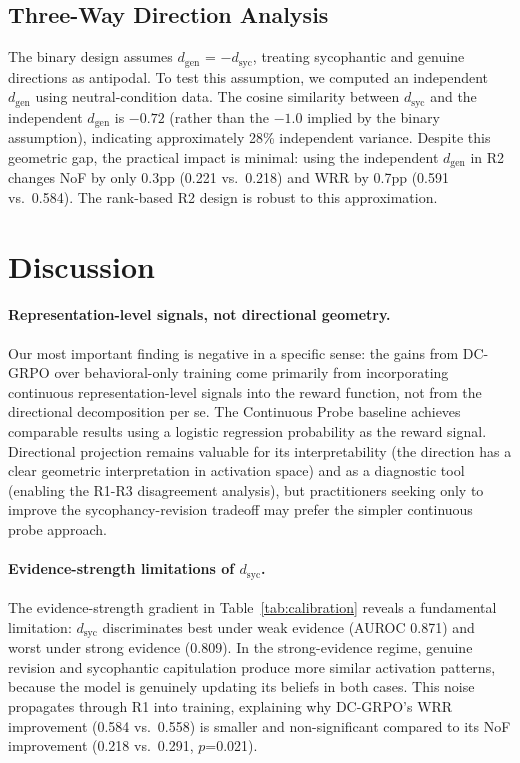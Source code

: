 \documentclass[11pt,a4paper]{article}
\newcommand{\dsyc}{$d_{\text{syc}}$}
\newcommand{\dgen}{$d_{\text{gen}}$}
\begin{document}
\subsection{Three-Way Direction Analysis}

The binary design assumes \dgen{} = $-$\dsyc{}, treating sycophantic and genuine directions as antipodal. To test this assumption, we computed an independent \dgen{} using neutral-condition data. The cosine similarity between \dsyc{} and the independent \dgen{} is $-0.72$ (rather than the $-1.0$ implied by the binary assumption), indicating approximately 28\% independent variance. Despite this geometric gap, the practical impact is minimal: using the independent \dgen{} in R2 changes NoF by only 0.3pp (0.221 vs.\ 0.218) and WRR by 0.7pp (0.591 vs.\ 0.584). The rank-based R2 design is robust to this approximation.

\section{Discussion}
\label{sec:discussion}

\paragraph{Representation-level signals, not directional geometry.} Our most important finding is negative in a specific sense: the gains from DC-GRPO over behavioral-only training come primarily from incorporating continuous representation-level signals into the reward function, not from the directional decomposition per se. The Continuous Probe baseline achieves comparable results using a logistic regression probability as the reward signal. Directional projection remains valuable for its interpretability (the direction has a clear geometric interpretation in activation space) and as a diagnostic tool (enabling the R1-R3 disagreement analysis), but practitioners seeking only to improve the sycophancy-revision tradeoff may prefer the simpler continuous probe approach.

\paragraph{Evidence-strength limitations of \dsyc{}.} The evidence-strength gradient in Table~\ref{tab:calibration} reveals a fundamental limitation: \dsyc{} discriminates best under weak evidence (AUROC 0.871) and worst under strong evidence (0.809). In the strong-evidence regime, genuine revision and sycophantic capitulation produce more similar activation patterns, because the model is genuinely updating its beliefs in both cases. This noise propagates through R1 into training, explaining why DC-GRPO's WRR improvement (0.584 vs.\ 0.558) is smaller and non-significant compared to its NoF improvement (0.218 vs.\ 0.291, $p$=0.021).
\end{document}
